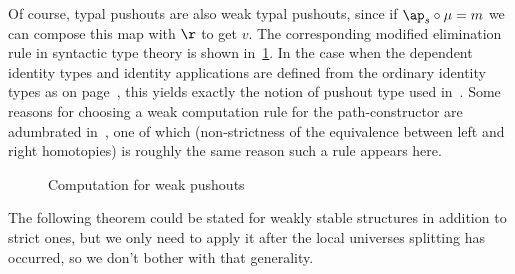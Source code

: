 Of course, typal pushouts are also weak typal pushouts, since if $\ap_s\circ \mu = m$ we can compose this map with $\r$ to get $v$.
The corresponding modified elimination rule in syntactic type theory is shown in~\cref{fig:wk-pushout}.
In the case when the dependent identity types and identity applications are defined from the ordinary identity types as on page~\pageref{idover}, this yields exactly the notion of pushout type used in~\cite[]{hottbook}.
Some reasons for choosing a weak computation rule for the path-constructor are adumbrated in~\cite[ and Chapter 6 Notes]{hottbook}, one of which (non-strictness of the equivalence between left and right homotopies) is roughly the same reason such a rule appears here.

\begin{figure}
  \centering
  \caption{Computation for weak pushouts}
  \label{fig:wk-pushout}
\end{figure}

The following theorem could be stated for weakly stable structures in addition to strict ones, but we only need to apply it after the local universes splitting has occurred, so we don't bother with that generality.

